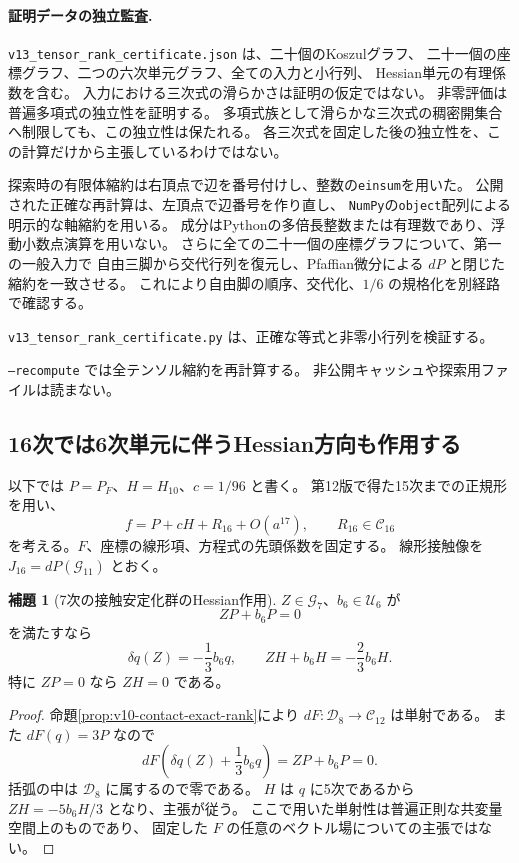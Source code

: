 \documentclass[a4paper,11pt]{ltjsarticle}
\theoremstyle{definition}
\newtheorem{lemma}[theorem]{補題}
\begin{document}
\paragraph{証明データの独立監査.}
\texttt{v13\_tensor\_rank\_certificate.json} は、二十個のKoszulグラフ、
二十一個の座標グラフ、二つの六次単元グラフ、全ての入力と小行列、
Hessian単元の有理係数を含む。
入力における三次式の滑らかさは証明の仮定ではない。
非零評価は普遍多項式の独立性を証明する。
多項式族として滑らかな三次式の稠密開集合へ制限しても、この独立性は保たれる。
各三次式を固定した後の独立性を、この計算だけから主張しているわけではない。

探索時の有限体縮約は右頂点で辺を番号付けし、整数の\texttt{einsum}を用いた。
公開された正確な再計算は、左頂点で辺番号を作り直し、
\texttt{NumPy}の\texttt{object}配列による明示的な軸縮約を用いる。
成分はPythonの多倍長整数または有理数であり、浮動小数点演算を用いない。
さらに全ての二十一個の座標グラフについて、第一の一般入力で
自由三脚から交代行列を復元し、Pfaffian微分による $dP$ と閉じた縮約を一致させる。
これにより自由脚の順序、交代化、$1/6$ の規格化を別経路で確認する。

\texttt{v13\_tensor\_rank\_certificate.py} は、正確な等式と非零小行列を検証する。

\texttt{--recompute} では全テンソル縮約を再計算する。
非公開キャッシュや探索用ファイルは読まない。

\subsection{16次では6次単元に伴うHessian方向も作用する}
\label{subsec:v13-filtered-contact}

以下では $P=P_F$、$H=H_{10}$、$c=1/96$ と書く。
第12版で得た15次までの正規形を用い、
\[
 f=P+cH+R_{16}+O(a^{17}),\qquad R_{16}\in\mathcal C_{16}
\]
を考える。$F$、座標の線形項、方程式の先頭係数を固定する。
線形接触像を $J_{16}=dP(\mathcal G_{11})$ とおく。

\begin{lemma}[7次の接触安定化群のHessian作用]
\label{lem:v13-seventh-stabilizer}
$Z\in\mathcal G_7$、$b_6\in\mathcal U_6$ が
\[
 ZP+b_6P=0
\]
を満たすなら
\[
 \delta q(Z)=-\frac13b_6q,\qquad
 ZH+b_6H=-\frac23b_6H.
\]
特に $ZP=0$ なら $ZH=0$ である。
\end{lemma}
\begin{proof}
命題\ref{prop:v10-contact-exact-rank}により
$dF:\mathcal D_8\to\mathcal C_{12}$ は単射である。
また $dF(q)=3P$ なので
\[
 dF\left(\delta q(Z)+\frac13b_6q\right)=ZP+b_6P=0.
\]
括弧の中は $\mathcal D_8$ に属するので零である。
$H$ は $q$ に5次であるから
$ZH=-5b_6H/3$ となり、主張が従う。
ここで用いた単射性は普遍正則な共変量空間上のものであり、
固定した $F$ の任意のベクトル場についての主張ではない。
\end{proof}
\end{document}
